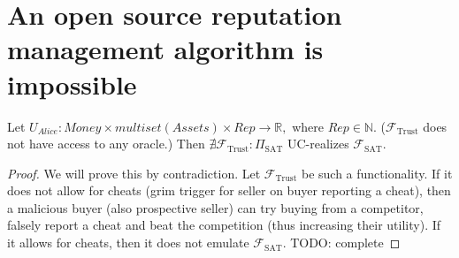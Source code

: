 \section{An open source reputation management algorithm is impossible}
  \begin{theorem}
    Let $U_{Alice} : Money \times multiset\left(Assets\right) \times Rep \rightarrow
    \mathbb{R},$ where $Rep \in \mathbb{N}$. ($\mathcal{F}_{\mathrm{Trust}}$ does not have
    access to any oracle.) Then $\nexists \mathcal{F}_{\mathrm{Trust}}:
    \Pi_{\mathrm{SAT}}$ UC-realizes $\mathcal{F}_{\mathrm{SAT}}$.
  \end{theorem}
  \begin{proof}
    We will prove this by contradiction. Let $\mathcal{F}_{\mathrm{Trust}}$ be such a
    functionality. If it does not allow for cheats (grim trigger for seller on buyer
    reporting a cheat), then a malicious buyer (also prospective seller) can try buying
    from a competitor, falsely report a cheat and beat the competition (thus increasing
    their utility). If it allows for cheats, then it does not emulate
    $\mathcal{F}_{\mathrm{SAT}}$. TODO: complete
  \end{proof}

